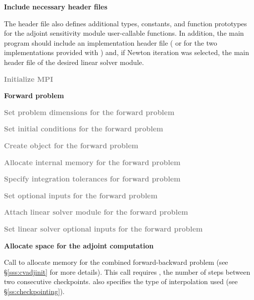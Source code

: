 \begin{Steps}

\item
  {\bf Include necessary header files}
  
  The  header file also defines additional types, constants, and
  function prototypes for the adjoint sensitivity module user-callable functions.
  In addition, the main program should include an {\nvector} 
  implementation header file ( or 
  for the two implementations provided with {\cvodes}) and, if Newton iteration 
  was selected, the main header file of the desired linear solver module.

\item
  \textcolor{gray}{\bf {\p} Initialize MPI}

  \vspace{0.2in}\centerline{\bf Forward problem}

\item
  \textcolor{gray}{\bf Set problem dimensions for the forward problem}

\item
  \textcolor{gray}{\bf Set initial conditions for the forward problem}

\item
  \textcolor{gray}{\bf Create {\cvodes} object for the forward problem}

\item
  \textcolor{gray}{\bf Allocate internal memory for the forward problem}

\item
  \textcolor{gray}{\bf Specify integration tolerances for forward problem}

\item
  \textcolor{gray}{\bf Set optional inputs for the forward problem}

\item
  \textcolor{gray}{\bf Attach linear solver module for the forward problem}

\item
  \textcolor{gray}{\bf Set linear solver optional inputs for the forward problem}

\item
  {\bf Allocate space for the adjoint computation}

  Call \id{()} to allocate memory for the 
  combined forward-backward problem (see \S\ref{sss:cvadjinit} for more details).
  This call requires , the number of steps between two consecutive checkpoints.
   also specifies the type of interpolation used 
  (see \S\ref{ss:checkpointing}).


\end{Steps}
